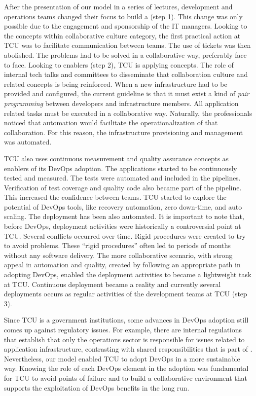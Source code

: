 After the presentation of our  model in a series of lectures, development and
operations teams changed their focus to build a \cc (step 1). This
change was only possible due to the engagement and sponsorship of the IT
managers. Looking to the concepts within collaborative culture category, the first practical
action at TCU was to facilitate communication between teams. The use of tickets
was then abolished. The problems had to be solved in a collaborative way, preferably
face to face.
Looking to enablers (step 2), TCU is applying  concepts.
The role of internal tech talks and committees to disseminate that collaboration
culture and related concepts is being reinforced.
When a new infrastructure had to be provided and configured, the current guideline is
that it must exist a kind of \emph{pair programming} between developers and infrastructure
members. All application related tasks must be executed in a collaborative
way. Naturally, the professionals noticed that automation would facilitate the
operationalization of that collaboration. For this reason, the infrastructure provisioning
and management was automated.

TCU also uses continuous measurement and quality assurance concepts as
enablers of its DevOps adoption. The applications started to be continuously
tested and measured. The tests were automated and included in the pipelines.
Verification of test coverage and quality code also became part of the pipeline.
This increased the confidence between teams. TCU started
to explore the potential of DevOps tools, like recovery automation, zero
down-time, and auto scaling. The deployment has been also automated.
It is important to note that, before DevOps, deployment activities were historically a controversial point at TCU.
Several conflicts occurred over time. Rigid procedures were created to try to
avoid problems. These ``rigid procedures'' often led to periods of months
without any software delivery. The more collaborative scenario, with strong appeal in automation and quality,
created by following an appropriate path in adopting DevOps, enabled the deployment activities to became
a lightweight task at TCU. Continuous deployment became a reality and currently several deployments
occurs as regular activities of the development teams at TCU (step 3).

Since TCU is a government institutions, some advances in DevOps adoption still comes up
against regulatory issues. For example, there are internal regulations that
establish that only the operations sector is responsible for issues related to
application infrastructure, contrasting with shared responsibilities that is
part of \cc. Nevertheless, our model enabled TCU to adopt DevOps in a more
sustainable way. Knowing the role
of each DevOps element in the adoption was fundamental for TCU to avoid points
of failure and to build a collaborative environment that supports the
exploitation of DevOps benefits in the long run.

